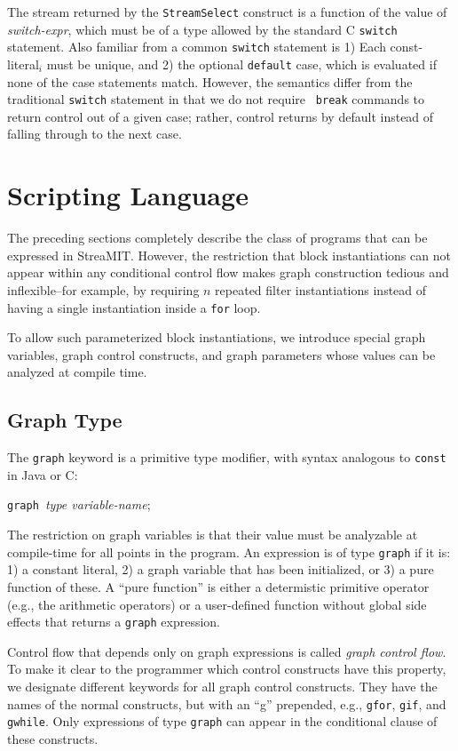 \documentclass[draft]{article}
\begin{document}
The stream returned by the {\tt StreamSelect} construct is a function
of the value of {\it switch-expr}, which must be of a type allowed by
the standard C {\tt switch} statement.  Also familiar from a common
{\tt switch} statement is 1) Each const-literal$_i$ must be unique,
and 2) the optional {\tt default} case, which is evaluated if none of
the case statements match.  However, the semantics differ from the
traditional {\tt switch} statement in that we do not require {\tt
break} commands to return control out of a given case; rather, control
returns by default instead of falling through to the next case.

\section{Scripting Language}
\label{sec:script}

The preceding sections completely describe the class of programs that
can be expressed in StreaMIT.  However, the restriction that block
instantiations can not appear within any conditional control flow
makes graph construction tedious and inflexible--for example, by
requiring $n$ repeated filter instantiations instead of having a
single instantiation inside a {\tt for} loop.

To allow such parameterized block instantiations, we introduce special
graph variables, graph control constructs, and graph parameters
whose values can be analyzed at compile time.

\subsection{Graph Type}

The {\tt graph} keyword is a primitive type modifier, with syntax
analogous to {\tt const} in Java or C:

\medskip
{\tt graph }{\it type variable-name};
\medskip

The restriction on graph variables is that their value must be
analyzable at compile-time for all points in the program.  An
expression is of type {\tt graph} if it is: 1) a constant literal, 2)
a graph variable that has been initialized, or 3) a pure function of
these.  A ``pure function'' is either a determistic primitive operator
(e.g., the arithmetic operators) or a user-defined function without
global side effects that returns a {\tt graph} expression.

Control flow that depends only on graph expressions is called {\it
graph control flow}.  To make it clear to the programmer which
control constructs have this property, we designate different keywords
for all graph control constructs.  They have the names of the normal
constructs, but with an ``g'' prepended, e.g., {\tt gfor}, {\tt gif},
and {\tt gwhile}.  Only expressions of type {\tt graph} can appear in
the conditional clause of these constructs.
\end{document}
